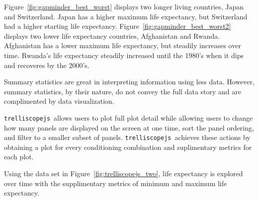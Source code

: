 \documentclass[stat,dissertation]{puthesis}\usepackage[]{graphicx}\usepackage{xcolor}
\newcommand{\pkg}[1]{\texttt{#1}}
\newcommand{\trelliscopejs}{\pkg{trelliscopejs}}
\begin{document}
Figure~\ref{fig:gapminder_best_worst} displays two longer living countries, Japan and Switzerland.  Japan has a higher maximum life expectancy, but Switzerland had a higher starting life expectancy.  Figure~\ref{fig:gapminder_best_worst2} displays two lower life expectancy countries, Afghanistan and Rwanda.  Afghanistan has a lower maximum life expectancy, but steadily increases over time.  Rwanda's life expectancy steadily increased until the 1980's when it dips and recoveres by the 2000's.

Summary statistics are great in interpreting information using less data.  However, summary statistics, by their nature, do not convey the full data story and are complimented by data visualization.

\trelliscopejs~allows users to plot full plot detail while allowing users to change how many panels are displayed on the screen at one time, sort the panel ordering, and filter to a smaller subset of panels.  \trelliscopejs~achieves these actions by obtaining a plot for every conditioning combination and suplimentary metrics for each plot.

Using the  data set in Figure~\ref{fig:trelliscopejs_two}, life expectancy is explored over time with the supplimentary metrics of minimum and maximum life expectancy.
\end{document}
